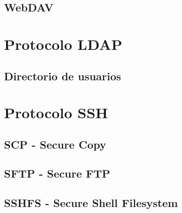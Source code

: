       \subsection {WebDAV}
    \section {Protocolo LDAP}
      \subsection {Directorio de usuarios}
    \section {Protocolo SSH}
      \subsection {SCP - Secure Copy}
      \subsection {SFTP - Secure FTP}
      \subsection {SSHFS - Secure Shell Filesystem}
